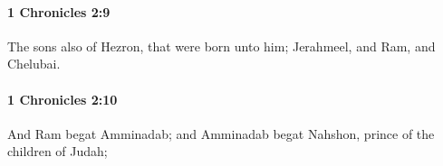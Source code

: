 		\paragraph{1 Chronicles 2:9} %
			\label{1CHRONICLES-2-9}

			The sons also of Hezron, that were born unto him; Jerahmeel, and Ram, and Chelubai.


		\paragraph{1 Chronicles 2:10} %
			\label{1CHRONICLES-2-10}

			And Ram begat Amminadab; and Amminadab begat Nahshon, prince of the children of Judah;


